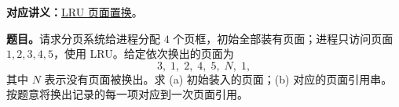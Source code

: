 
\begingroup
\setlength{\parskip}{0.4em}
\renewcommand{\recordid}[1]{}
\renewcommand{\relatedtopic}[2]{\hyperref[topic:#1]{#2}}

\label{tutorial:SC2005-TUT10}



\textbf{对应讲义：}\relatedtopic{SC2005-L18-T03}{LRU 页面置换}。

\textbf{题目。}请求分页系统给进程分配 $4$ 个页框，初始全部装有页面；进程只访问页面 $1,2,3,4,5$，使用 LRU。给定依次换出的页面为
\[
  3,\;1,\;2,\;4,\;5,\;N,\;1,
\]
其中 $N$ 表示没有页面被换出。求 (a) 初始装入的页面；(b) 对应的页面引用串。按题意将换出记录的每一项对应到一次页面引用。

